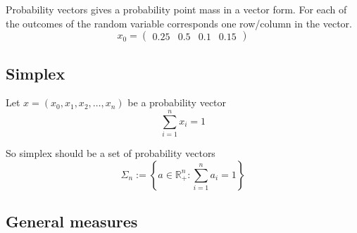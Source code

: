 Probability vectors gives a probability point mass in a vector form.
For each of the outcomes of the random variable corresponds one row/column in the vector.
$$
x_{0} = \begin{pmatrix}
0.25 & 0.5 & 0.1 & 0.15
\end{pmatrix}
$$


\subsection{Simplex}

Let $x = (x_{0}, x_{1}, x_{2}, \dots, x_{n})$ be a probability vector
$$
\sum_{i=1}^{n} x_{i} = 1
$$

So simplex should be a set of probability vectors
$$
\Sigma_{n} := \left\{ a \in \mathbb{R}_{+}^{n} : \sum_{i=1}^{n} a_{i} = 1 \right\}
$$

\subsection{General measures}





